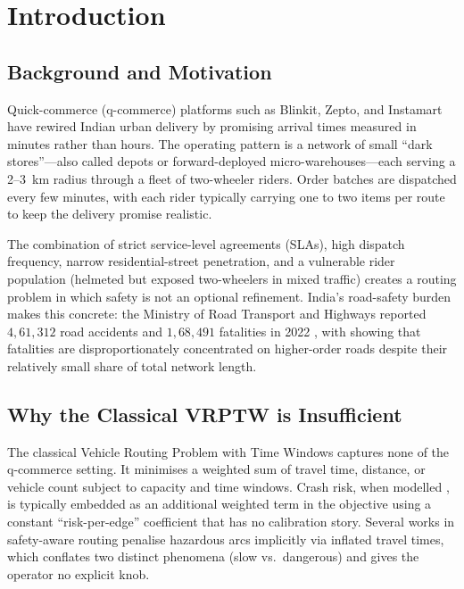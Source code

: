 \chapter{Introduction}

\section{Background and Motivation}

Quick-commerce (q-commerce) platforms such as Blinkit, Zepto, and
Instamart have rewired Indian urban delivery by promising arrival
times measured in minutes rather than hours. The operating pattern is
a network of small ``dark stores''---also called depots or
forward-deployed micro-warehouses---each serving a 2--3~km radius
through a fleet of two-wheeler riders. Order batches are dispatched
every few minutes, with each rider typically carrying one to two
items per route to keep the delivery promise realistic.

The combination of strict service-level agreements (SLAs), high
dispatch frequency, narrow residential-street penetration, and a
vulnerable rider population (helmeted but exposed two-wheelers in
mixed traffic) creates a routing problem in which safety is not an
optional refinement. India's road-safety burden makes this concrete:
the Ministry of Road Transport and Highways reported $4{,}61{,}312$
road accidents and $1{,}68{,}491$ fatalities in 2022
\citep{morth2022}, with \citet{mohan2017} showing that fatalities are
disproportionately concentrated on higher-order roads despite their
relatively small share of total network length.

\section{Why the Classical VRPTW is Insufficient}

The classical Vehicle Routing Problem with Time Windows
\citep{solomon1987,desrochers1992,toth2002} captures none of the
q-commerce setting. It minimises a weighted sum of travel time,
distance, or vehicle count subject to capacity and time windows.
Crash risk, when modelled \citep{hoseinzadeh2020}, is typically
embedded as an additional weighted term in the objective using a
constant ``risk-per-edge'' coefficient that has no calibration
story. Several works in safety-aware routing penalise hazardous arcs
implicitly via inflated travel times, which conflates two distinct
phenomena (slow vs.\ dangerous) and gives the operator no explicit
knob.

